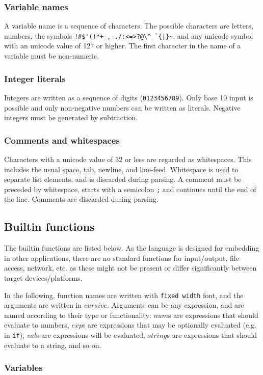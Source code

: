 \documentclass[11pt]{report}
\begin{document}
\subsubsection{Variable names}
A variable name is a sequence of characters. The possible characters are letters, numbers, the symbols \verb"!#$'()*+-,-./:<=>?@\^_`{|}~", and any unicode symbol with an unicode value of 127 or higher. The first character in the name of a variable must be non-numeric.

\subsubsection{Integer literals}

Integers are written as a sequence of digits (\verb|0123456789|). Only base 10 input is possible and only non-negative numbers can be written as literals. Negative integers must be generated by subtraction.

\subsubsection{Comments and whitespaces}
Characters with a unicode value of 32 or less are regarded as whitespaces. This includes the usual space, tab, newline, and line-feed. Whitespace is used to separate list elements, and is discarded during parsing. A comment must be preceded by whitespace, starts with a semicolon \verb|;| and continues until the end of the line. Comments are discarded during parsing.

\subsection{Builtin functions}
The builtin functions are listed below. As the language is designed for embedding in other applications, there are no standard functions for input/output, file access, network, etc. as these might not be present or differ significantly between target devices/platforms.

In the following, function names are written with {\tt fixed width} font, and the arguments are written in $cursive$. Arguments can be any expression, and are named according to their type or functionality: $num$s are expressions that should evaluate to numbers, $exp$s are expressions that may be optionally evaluated (e.g. in {\tt if}), $val$s are expressions will be evaluated, $string$s are expressions that should evaluate to a string, and so on.

\subsubsection{Variables}
\end{document}
